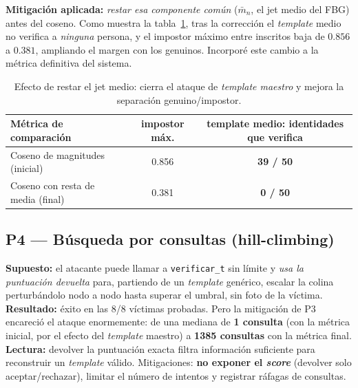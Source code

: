 \documentclass[11pt,a4paper]{article}
\begin{document}
\textbf{Mitigación aplicada:} \emph{restar esa componente común} ($\bar m_n$, el jet medio del
FBG) antes del coseno. Como muestra la tabla~\ref{tab:maestro}, tras la corrección el
\emph{template} medio no verifica a \emph{ninguna} persona, y el impostor máximo entre inscritos
baja de $0.856$ a $0.381$, ampliando el margen con los genuinos. Incorporé este cambio a la
métrica definitiva del sistema.

\begin{table}[h]
\centering\small
\begin{tabular}{@{}lcc@{}}
\toprule
\textbf{Métrica de comparación} & \textbf{impostor máx.} & \textbf{template medio: identidades que verifica} \\
\midrule
Coseno de magnitudes (inicial)       & 0.856 & \textbf{39 / 50} \\
Coseno con resta de media (final)    & 0.381 & \textbf{0 / 50} \\
\bottomrule
\end{tabular}
\caption{Efecto de restar el jet medio: cierra el ataque de \emph{template maestro} y mejora la
separación genuino/impostor.}
\label{tab:maestro}
\end{table}

\subsection{P4 --- Búsqueda por consultas (hill-climbing)}
\textbf{Supuesto:} el atacante puede llamar a \texttt{verificar\_t} sin límite y \emph{usa la
puntuación devuelta} para, partiendo de un \emph{template} genérico, escalar la colina
perturbándolo nodo a nodo hasta superar el umbral, sin foto de la víctima.
\textbf{Resultado:} éxito en las 8/8 víctimas probadas. Pero la mitigación de P3 encareció el
ataque enormemente: de una mediana de \textbf{1 consulta} (con la métrica inicial, por el efecto
del \emph{template} maestro) a \textbf{\num{1385} consultas} con la métrica final.
\textbf{Lectura:} devolver la puntuación exacta filtra información suficiente para reconstruir
un \emph{template} válido. Mitigaciones: \textbf{no exponer el \emph{score}} (devolver solo
aceptar/rechazar), limitar el número de intentos y registrar ráfagas de consultas.
\end{document}
